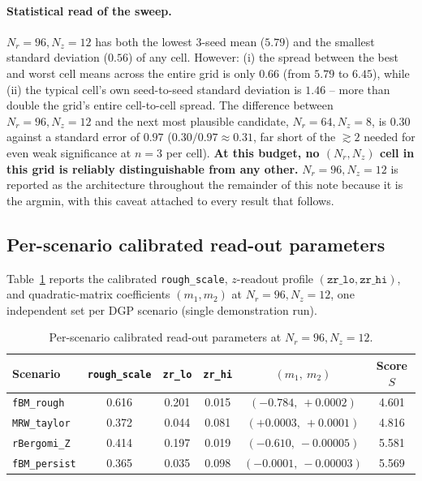 \documentclass[11pt,a4paper]{article}
\begin{document}
\paragraph{Statistical read of the sweep.} $N_r=96,N_z=12$ has both the
lowest 3-seed mean ($5.79$) and the smallest standard deviation
($0.56$) of any cell. However: (i) the spread between the best and
worst cell means across the entire grid is only $0.66$ (from $5.79$ to
$6.45$), while (ii) the typical cell's own seed-to-seed standard
deviation is $1.46$ -- more than double the grid's entire cell-to-cell
spread. The difference between $N_r=96,N_z=12$ and the next most
plausible candidate, $N_r=64,N_z=8$, is $0.30$ against a standard error
of $0.97$ ($0.30/0.97\approx0.31$, far short of the $\gtrsim2$ needed
for even weak significance at $n=3$ per cell). \textbf{At this budget,
no $(N_r,N_z)$ cell in this grid is reliably distinguishable from any
other.} $N_r=96,N_z=12$ is reported as the architecture throughout the
remainder of this note because it is the argmin, with this caveat
attached to every result that follows.

\subsection{Per-scenario calibrated read-out parameters}
\label{sec:amplitude}

Table~\ref{tab:perscenario} reports the calibrated
\texttt{rough\_scale}, $z$-readout profile
$(\texttt{zr\_lo},\texttt{zr\_hi})$, and quadratic-matrix coefficients
$(m_1,m_2)$ at $N_r=96,N_z=12$, one independent set per DGP scenario
(single demonstration run).

\begin{table}[h]
\centering
\caption{Per-scenario calibrated read-out parameters at $N_r=96,N_z=12$.}
\label{tab:perscenario}
\begin{tabular}{@{}lccccc@{}}
\toprule
Scenario & \texttt{rough\_scale} & \texttt{zr\_lo} & \texttt{zr\_hi} & $(m_1,\ m_2)$ & Score $S$ \\
\midrule
\texttt{fBM\_rough}    & 0.616 & 0.201 & 0.015 & $(-0.784,\ +0.0002)$ & 4.601 \\
\texttt{MRW\_taylor}   & 0.372 & 0.044 & 0.081 & $(+0.0003,\ +0.0001)$ & 4.816 \\
\texttt{rBergomi\_Z}   & 0.414 & 0.197 & 0.019 & $(-0.610,\ -0.00005)$ & 5.581 \\
\texttt{fBM\_persist}  & 0.365 & 0.035 & 0.098 & $(-0.0001,\ -0.00003)$ & 5.569 \\
\bottomrule
\end{tabular}
\end{table}
\end{document}
